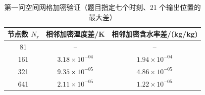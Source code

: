 \begin{table}[htbp]
  \centering
  \caption{第一问空间网格加密验证（题目指定七个时刻、21 个输出位置的最大差）}
  \label{tab:validation}
  \scriptsize
  \begin{tabular}{ccc}
    \toprule
    节点数 $N_r$ & 相邻加密温度差/K & 相邻加密含水率差/(kg/kg) \\
    \midrule
    81 & -- & -- \\
    161 & $3.18\times10^{-04}$ & $1.94\times10^{-04}$ \\
    321 & $9.35\times10^{-05}$ & $4.86\times10^{-05}$ \\
    641 & $2.11\times10^{-05}$ & $1.22\times10^{-05}$ \\
    \bottomrule
  \end{tabular}
\end{table}
